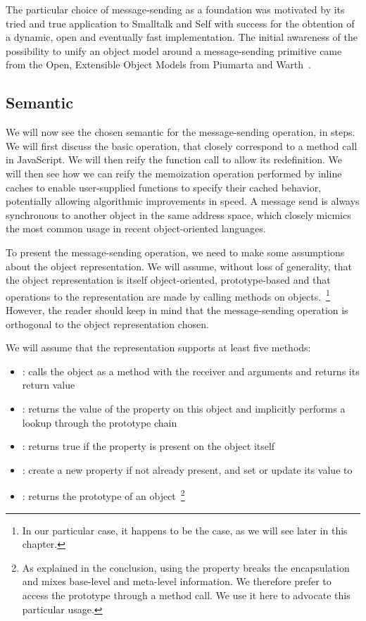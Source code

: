 The particular choice of message-sending as a foundation was motivated by its
tried and true application to Smalltalk and Self with success for the obtention
of a dynamic, open and eventually fast implementation. The initial awareness of
the possibility to unify an object model around a message-sending primitive
came from the Open, Extensible Object Models from Piumarta and
Warth~\cite{Piumarta:2008}.

\subsection{Semantic}

We will now see the chosen semantic for the message-sending operation, in
steps. We will first discuss the basic operation, that closely correspond to a
method call in JavaScript. We will then reify the function call to allow its
redefinition. We will then see how we can reify the memoization operation
performed by inline caches to enable user-supplied functions to specify their
cached behavior, potentially allowing algorithmic improvements in speed. A
message send is always synchronous to another object in the same address space,
which closely micmics the most common usage in recent object-oriented
languages.

To present the message-sending operation, we need to make some assumptions
about the object representation. We will assume, without loss of generality,
that the object representation is itself object-oriented, prototype-based and
that operations to the representation are made by calling methods on
objects.~\footnote{In our particular case, it happens to be the case, as
we will see later in this chapter.} However, the reader should keep in mind
that the message-sending operation is orthogonal to the object representation
chosen. 

We will assume that the representation supports at least five methods:
\begin{itemize}
    \item {}: calls the object as a method with the
     receiver and  arguments and returns its return value
    \item {}: returns the value of the  property on
    this object and implicitly performs a lookup through the prototype chain
    \item {}: returns true if the 
    property is present on the object itself
    \item {}: create a new  property if not already
    present, and set or update its value to  
    \item {}: returns the prototype of an
    object~\footnote{As explained in the conclusion, using the 
    property breaks the encapsulation and mixes base-level and meta-level
    information. We therefore prefer to access the prototype through a method
    call. We use it here to advocate this particular usage.}
\end{itemize}

